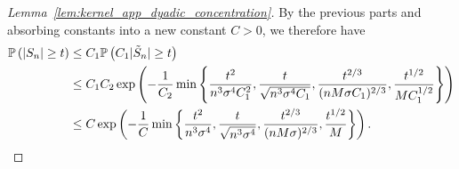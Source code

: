\begin{proof}[Lemma~\ref{lem:kernel_app_dyadic_concentration}]

  By the previous parts
  and absorbing constants into a new constant $C > 0$,
  we therefore have
  \begin{align*}
    \P\left(
      |S_n| \geq t
    \right)
    &\leq
    C_1 \P\left(
      C_1 |\tilde S_n| \geq t
    \right) \\
    &\leq
    C_1 C_2 \exp\left(
      -\frac{1}{C_2}
      \min \left\{
        \frac{t^2}{n^3 \sigma^4 C_1^2},
        \frac{t}{\sqrt{n^3 \sigma^4 C_1}},
        \frac{t^{2/3}}{(n M \sigma C_1)^{2/3}},
        \frac{t^{1/2}}{M C_1^{1/2}}
      \right\}
    \right) \\
    &\leq
    C \exp\left(
      -\frac{1}{C}
      \min \left\{
        \frac{t^2}{n^3 \sigma^4},
        \frac{t}{\sqrt{n^3 \sigma^4}},
        \frac{t^{2/3}}{(n M \sigma)^{2/3}},
        \frac{t^{1/2}}{M}
      \right\}
    \right).
  \end{align*}
\end{proof}

